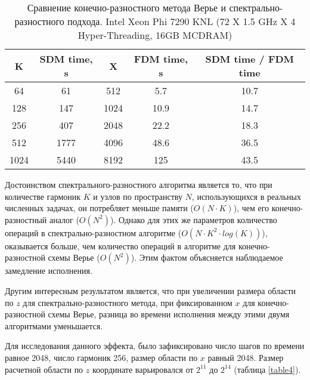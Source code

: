 \begin{center}
\begin{table}[h!]
\centering
  \begin{tabular}{|c|c|c|c|c|}
   \hline
	\textbf{K} &  \textbf{SDM time, s} & \textbf{X} & \textbf{FDM time, s} & \textbf{SDM time / FDM time} \\
	\hline
	64 &  61 & 512 & 5.7 & 10.7 \\
	\hline
	128 &  147 & 1024 & 10.9 & 14.7 \\
	\hline
	256 &  407 & 2048 & 22.2 & 18.3 \\
	\hline
	512 &  1777 & 4096 & 48.6 & 36.5 \\
	\hline
	1024 &  5440 & 8192 & 125 & 43.5 \\
  \hline 
  \end{tabular}
  \captionsetup{justification=centering}
  \caption{Сравнение конечно-разностного метода Верье и спектрально-разностного подхода. Intel Xeon Phi 7290 KNL (72 X 1.5 GHz X 4 Hyper-Threading, 16GB MCDRAM)}\label{table}
\end{table}
\end{center}

Достоинством спектрального-разностного алгоритма является то, что при количестве гармоник $K$ и узлов по пространству $N$,
использующихся в реальных численных задачах, он потребляет меньше памяти ($O(N\cdot K)$), чем его конечно-разностный аналог ($O(N^2)$).
Однако для этих же параметров количество операций в спектрально-разностном алгоритме ($O(N\cdot K^2\cdot log(K))$),
оказывается больше, чем количество операций в алгоритме для конечно-разностной схемы Верье ($O(N^2)$).
Этим фактом объясняется наблюдаемое замедление исполнения. 

Другим интересным результатом является, что при увеличении размера области по $z$ для спектрально-разностного метода, при фиксированном $x$ для конечно-разностной схемы Верье, разница во времени исполнения между этими двумя алгоритмами уменьшается.

Для исследования данного эффекта, было зафиксировано число шагов по времени равное 2048, число гармоник 256, размер области по $x$ равный 2048.
Размер расчетной области по $z$ координате варьировался от $2^{11}$ до $2^{14}$ (таблица \ref{table4}).

